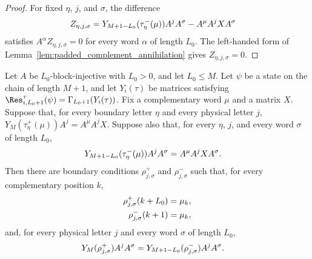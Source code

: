 \begin{proof}
    \leanok
    For fixed $\eta$, $j$, and $\sigma$, the difference
    \begin{align}
        Z_{\eta,j,\sigma}
         & =
        Y_{M+1-L_0}(\tau^-_\eta(\mu))A^jA^\sigma
        -
        A^\mu A^jXA^\sigma
        \notag
    \end{align}
    satisfies $A^\alpha Z_{\eta,j,\sigma}=0$ for every word $\alpha$ of length
    $L_0$. The left-handed form of
    Lemma~\ref{lem:padded_complement_annihilation} gives
    $Z_{\eta,j,\sigma}=0$.
\end{proof}

\begin{lemma}
    \label{lem:closure_property_auxiliary_product_from_opposite_boundary_words}
    \leanok
    Let $A$ be $L_0$-block-injective with $L_0>0$, and let $L_0\le M$.
    Let $\psi$ be a state on the chain of length $M+1$, and let
    $Y_i(\tau)$ be matrices satisfying
    $\Res^{\tau}_{i,L_0+1}(\psi)=\Gamma_{L_0+1}(Y_i(\tau))$.
    Fix a complementary word $\mu$ and a matrix $X$. Suppose that, for every
    boundary letter $\eta$ and every physical letter $j$,
    $Y_M(\tau^+_\eta(\mu))A^j = A^\mu A^jX$.
    Suppose also that, for every $\eta$, $j$, and every word $\sigma$ of length
    $L_0$,
    \begin{align}
        Y_{M+1-L_0}(\tau^-_\eta(\mu))A^jA^\sigma
         & =
        A^\mu A^jXA^\sigma.
        \notag
    \end{align}
    Then there are boundary conditions $\rho^+_{j,\sigma}$ and
    $\rho^-_{j,\sigma}$ such that, for every complementary position $k$,
    \begin{align}
        \rho^+_{j,\sigma}(k+L_0)
         & =
        \mu_k,
        \notag \\
        \rho^-_{j,\sigma}(k+1)
         & =
        \mu_k,
        \notag
    \end{align}
    and, for every physical letter $j$ and every word $\sigma$ of length
    $L_0$,
    \begin{align}
        Y_M(\rho^+_{j,\sigma})A^jA^\sigma
         & =
        Y_{M+1-L_0}(\rho^-_{j,\sigma})A^jA^\sigma.
        \notag
    \end{align}
\end{lemma}

